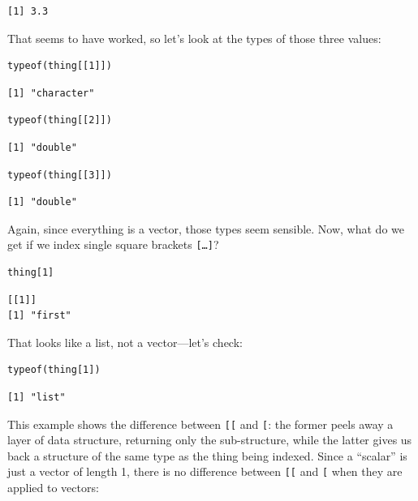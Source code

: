 \begin{lstlisting}
[1] 3.3
\end{lstlisting}

That seems to have worked,
so let's look at the types of those three values:

\begin{lstlisting}
typeof(thing[[1]])
\end{lstlisting}

\begin{lstlisting}
[1] "character"
\end{lstlisting}

\begin{lstlisting}
typeof(thing[[2]])
\end{lstlisting}

\begin{lstlisting}
[1] "double"
\end{lstlisting}

\begin{lstlisting}
typeof(thing[[3]])
\end{lstlisting}

\begin{lstlisting}
[1] "double"
\end{lstlisting}

Again,
since everything is a vector,
those types seem sensible.
Now,
what do we get if we index single square brackets \texttt{[\ldots{}]}?

\begin{lstlisting}
thing[1]
\end{lstlisting}

\begin{lstlisting}
[[1]]
[1] "first"
\end{lstlisting}

That looks like a list, not a vector---let's check:

\begin{lstlisting}
typeof(thing[1])
\end{lstlisting}

\begin{lstlisting}
[1] "list"
\end{lstlisting}

This example shows the difference between \texttt{[[} and \texttt[:
the former peels away a layer of data structure,
returning only the sub-structure,
while the latter gives us back a structure of the same type as the thing being indexed.
Since a ``scalar'' is just a vector of length 1,
there is no difference between \texttt{[[} and \texttt[ when they are applied to vectors:

